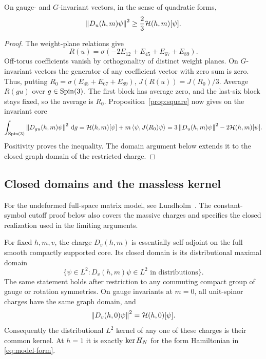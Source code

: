 \begin{lemma}
\label{lem:coercive-charge}
On gauge- and \(G\)-invariant vectors, in the sense of quadratic
forms,
\begin{equation}
\label{eq:coercive-charge}
 \left\lVert D_u(h,m)\psi\right\rVert^2\geq\frac23\mathcal H(h,m)[\psi].
\end{equation}
\end{lemma}

\begin{proof}
The weight-plane relations give
\[
 R(u)=\sigma(-2E_{12}+E_{45}+E_{67}+E_{89}).
\]
Off-torus coefficients vanish by orthogonality of distinct weight
planes. On \(G\)-invariant vectors the generator of any coefficient
vector with zero sum is zero. Thus, putting
\(R_0=\sigma(E_{45}+E_{67}+E_{89})\),
\(J(R(u))=J(R_0)/3\). Average \(R(gu)\) over
\(g\in\operatorname{Spin}(3)\). The first block has average zero, and the
last-six block stays fixed, so the average is \(R_0\).
Proposition~\ref{prop:square} now gives on the invariant core
\[
 \int_{\operatorname{Spin}(3)}\left\lVert D_{gu}(h,m)\psi\right\rVert^2\,\mathrm d g
 =\mathcal H(h,m)[\psi]+m\left\langle \psi,J(R_0)\psi\right\rangle
 =3\left\lVert D_u(h,m)\psi\right\rVert^2-2\mathcal H(h,m)[\psi].
\]
Positivity proves the inequality. The domain argument below extends
it to the closed graph domain of the restricted charge.
\end{proof}

\subsection{Closed domains and the massless kernel}

For the undeformed full-space matrix model, see
Lundholm~\cite[Theorem~3.1]{Lundholm2010}. The constant-symbol cutoff
proof below also covers the massive charges and specifies the closed
realization used in the limiting arguments.

\begin{lemma}
\label{lem:domains}
For fixed \(h,m,v\), the charge \(D_v(h,m)\) is essentially
self-adjoint on the full smooth compactly supported core. Its closed
domain is its distributional maximal domain
\[
 \{\psi\in L^2:D_v(h,m)\psi\in L^2\text{ in distributions}\}.
\]
The same statement holds after restriction to any commuting compact
group of gauge or rotation symmetries. On gauge invariants at
\(m=0\), all unit-spinor charges have the same graph domain, and
\[
 \left\lVert D_v(h,0)\psi\right\rVert^2=\mathcal H(h,0)[\psi].
\]
Consequently the distributional \(L^2\) kernel of any one of these
charges is their common kernel. At \(h=1\) it is exactly \(\operatorname{ker} H_N\)
for the form Hamiltonian in \eqref{eq:model-form}.
\end{lemma}

